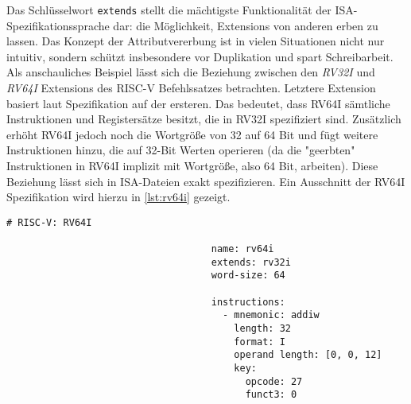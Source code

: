 Das Schlüsselwort \texttt{extends} stellt die mächtigste Funktionalität der
ISA-Spezifikationssprache dar: die Möglichkeit, Extensions von anderen erben zu
lassen. Das Konzept der Attributvererbung ist in vielen Situationen nicht nur
intuitiv, sondern schützt insbesondere vor Duplikation und spart Schreibarbeit.
Als anschauliches Beispiel lässt sich die Beziehung zwischen den \emph{RV32I}
und \emph{RV64I} Extensions des RISC-V Befehlssatzes betrachten. Letztere
Extension basiert laut Spezifikation auf der ersteren. Das bedeutet, dass RV64I
sämtliche Instruktionen und Registersätze besitzt, die in RV32I spezifiziert
sind. Zusätzlich erhöht RV64I jedoch noch die Wortgröße von 32 auf 64 Bit und
fügt weitere Instruktionen hinzu, die auf 32-Bit Werten operieren (da die
"geerbten" Instruktionen in RV64I implizit mit Wortgröße, also 64 Bit,
arbeiten). Diese Beziehung lässt sich in ISA-Dateien exakt spezifizieren. Ein
Ausschnitt der RV64I Spezifikation wird hierzu in \autoref{lst:rv64i} gezeigt.

\begin{table}
\begin{lstlisting}[language=ISA]
                                    # RISC-V: RV64I

                                    name: rv64i
                                    extends: rv32i
                                    word-size: 64

                                    instructions:
                                      - mnemonic: addiw
                                        length: 32
                                        format: I
                                        operand length: [0, 0, 12]
                                        key:
                                          opcode: 27
                                          funct3: 0
\end{lstlisting}
\begin{lstlisting}[caption={Ein Ausschnitt der Definition der RV64I-Extension des RISC-V Befehlssatzes. Zur Vererbung der Attribute von RV32I benötigt es lediglich der Spezifikation der \texttt{extends} Klausel. Zusätzlich wird die Wortgröße sowie eine Hand voll weiterer Befehle neu definiert.}, label={lst:rv64i}]
\end{lstlisting}
\end{table}
